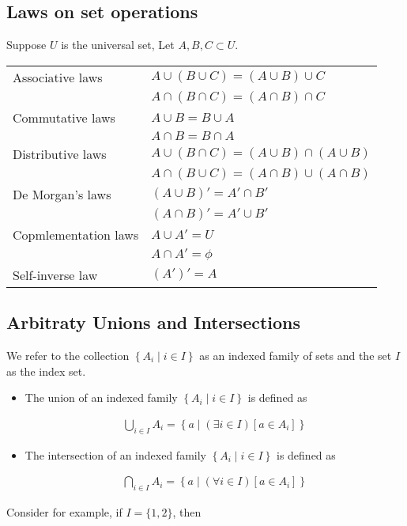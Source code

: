 \documentclass[12pt,a4paper]{article}
\begin{document}
      \subsection{Laws on set operations} 
       Suppose \(U\) is the universal set, Let \(A, B, C \subset U\).

       \begin{tabular}{|l||l|}
        \hline Associative laws & \(A \cup(B \cup C)=(A \cup B) \cup C\) \\
        & \(A \cap(B \cap C)=(A \cap B) \cap C\) \\
        \hline Commutative laws & \(A \cup B = B \cup A\) \\
        & \(A \cap B = B \cap A\) \\
        \hline Distributive laws & \(A \cup \left( B \cap C \right) = \left( A \cup B  \right) \cap \left( A \cup B \right) \) \\
        & \(A \cap \left( B \cup C \right) = \left( A \cap B \right) \cup \left( A \cap B \right) \) \\
        \hline De Morgan's laws & \(\left( A \cup B \right)' = A' \cap B'\) \\
        & \(\left( A \cap B  \right)' = A' \cup B'\) \\
        \hline Copmlementation laws & \(A \cup A' = U\) \\
        & \(A \cap A'= \phi \) \\
        \hline Self-inverse law & \( \left( A' \right)' = A \) \\         
        \hline 
      \end{tabular}  
    
     \subsection{Arbitraty Unions and Intersections} 
    We refer to the collection \(\left\{A_i \mid i \in I\right\}\) as an indexed family of sets and the set \(I\) as the index set.
    \begin{itemize}
        \item The union of an indexed family \(\left\{A_i \mid i \in I\right\}\) is defined as

        \begin{align*}
        \bigcup_{i \in I} A_i=\left\{a \mid(\exists i \in I)\left[a \in A_i\right]\right\}
        \end{align*}

        \item The intersection of an indexed family \(\left\{A_i \mid i \in I\right\}\) is defined as

        \begin{align*}
        \bigcap_{i \in I} A_i=\left\{a \mid(\forall i \in I)\left[a \in A_i\right]\right\}
        \end{align*}
    \end{itemize}
Consider for example, if \(I=\{1,2\}\), then 
\end{document}
